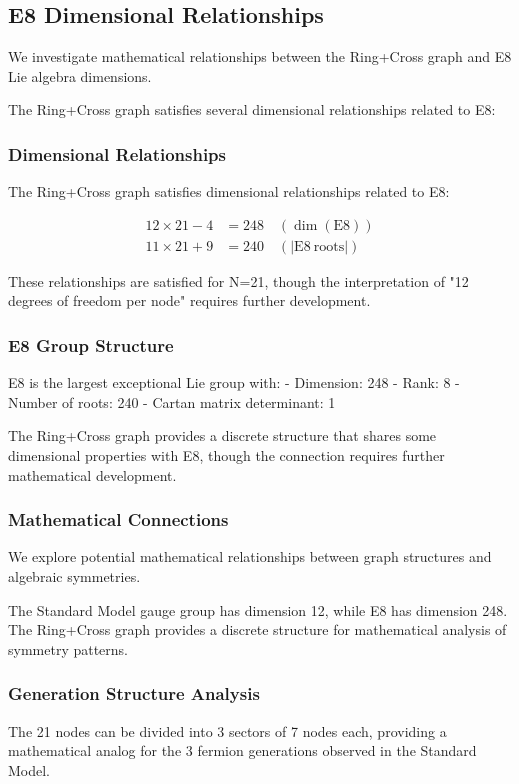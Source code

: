 \documentclass[12pt,a4paper]{article}
\begin{document}
\subsection{E8 Dimensional Relationships}

We investigate mathematical relationships between the Ring+Cross graph and E8 Lie algebra dimensions.

The Ring+Cross graph satisfies several dimensional relationships related to E8:

\subsubsection{Dimensional Relationships}

The Ring+Cross graph satisfies dimensional relationships related to E8:

\begin{align}
12 \times 21 - 4 &= 248 \quad (\dim(\mathrm{E8})) \\
11 \times 21 + 9 &= 240 \quad (|\mathrm{E8\ roots}|)
\end{align}

These relationships are satisfied for N=21, though the interpretation of "12 degrees of freedom per node" requires further development.

\subsubsection{E8 Group Structure}
E8 is the largest exceptional Lie group with:
- Dimension: 248
- Rank: 8
- Number of roots: 240
- Cartan matrix determinant: 1

The Ring+Cross graph provides a discrete structure that shares some dimensional properties with E8, though the connection requires further mathematical development.

\subsubsection{Mathematical Connections}
We explore potential mathematical relationships between graph structures and algebraic symmetries.

The Standard Model gauge group has dimension 12, while E8 has dimension 248. The Ring+Cross graph provides a discrete structure for mathematical analysis of symmetry patterns.

\subsubsection{Generation Structure Analysis}
The 21 nodes can be divided into 3 sectors of 7 nodes each, providing a mathematical analog for the 3 fermion generations observed in the Standard Model.
\end{document}
